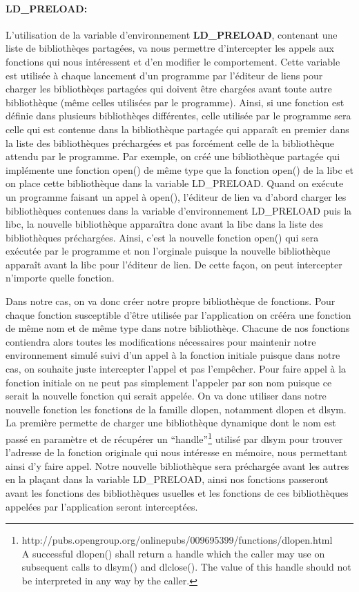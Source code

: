 \paragraph{LD\_PRELOAD:}
L'utilisation de la variable d'environnement
\textbf{LD\_PRELOAD}\cite{INTERCEPTION:LD_PRELOAD}, contenant une liste de
bibliothèqes partagées, va nous permettre d'intercepter les appels aux fonctions
qui nous intéressent et d'en modifier le comportement. Cette variable est
utilisée à chaque lancement d'un programme par l'éditeur de liens pour charger
les bibliothèqes partagées qui doivent être chargées avant toute autre
bibliothèque (même celles utilisées par le programme). Ainsi, si une fonction
est définie dans plusieurs bibliothèqes différentes, celle utilisée par le
programme sera celle qui est contenue dans la bibliothèque partagée qui apparaît
en premier dans la liste des bibliothèques préchargées et pas forcément celle de
la bibliothèque attendu par le programme. Par exemple, on créé une
bibliothèque partagée qui implémente une fonction open() de même type que la
fonction open() de la libc et on place cette bibliothèque dans la variable
LD\_PRELOAD. Quand on exécute un programme faisant un appel à open(), l'éditeur
de lien va d'abord charger les bibliothèques contenues dans la variable
d'environnement LD\_PRELOAD puis la libc, la nouvelle bibliothèque apparaîtra
donc avant la libc dans la liste des bibliothèques préchargées. Ainsi, c'est la
nouvelle fonction open() qui sera exécutée par le programme et non l'orginale
puisque la nouvelle bibliothèque apparaît avant la libc pour l'éditeur de
lien. De cette façon, on peut intercepter n'importe quelle fonction.

Dans notre cas, on va donc créer notre propre bibliothèque de fonctions. Pour
chaque fonction susceptible d'être utilisée par l'application on crééra une
fonction de même nom et de même type dans notre bibliothèqe. Chacune de nos
fonctions contiendra alors toutes les modifications nécessaires pour maintenir
notre environnement simulé suivi d'un appel à la fonction initiale puisque dans
notre cas, on souhaite juste intercepter l'appel et pas l'empêcher. Pour faire
appel à la fonction initiale on ne peut pas simplement l'appeler par son nom
puisque ce serait la nouvelle fonction qui serait appelée. On va donc utiliser
dans notre nouvelle fonction les fonctions de la famille dlopen, notamment
dlopen et dlsym. La première permette de charger une bibliothèque dynamique dont
le nom est passé en paramètre et de récupérer un ``handle''\footnote{http://pubs.opengroup.org/onlinepubs/009695399/functions/dlopen.html \\ A successful dlopen() shall return a handle which the caller may use on subsequent calls to dlsym() and dlclose(). The value of this handle should not be interpreted in any way by the caller.} utilisé par dlsym
pour trouver l'adresse de la fonction originale qui nous intéresse en mémoire,
nous permettant ainsi d'y faire appel. Notre nouvelle bibliothèque sera
préchargée avant les autres en la plaçant dans la variable LD\_PRELOAD, ainsi
nos fonctions passeront avant les fonctions des bibliothèques usuelles et les
fonctions de ces bibliothèques appelées par l'application seront interceptées.


